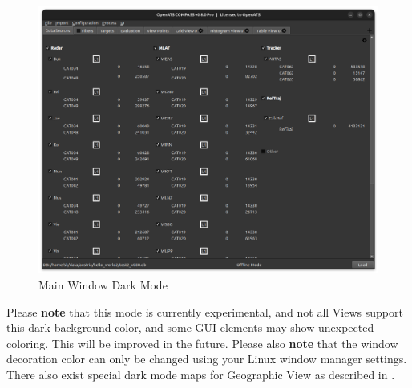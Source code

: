 \begin{figure}[H]
  \hspace*{-2.5cm}
    \includegraphics[width=19cm]{figures/dark_mode.png}
  \caption{Main Window Dark Mode}
\end{figure}

Please \textbf{note} that this mode is currently experimental, and not all Views support this dark background color, and some GUI elements may show unexpected coloring. This will be improved in the future. Please also \textbf{note} that the window decoration color can only be changed using your Linux window manager settings. \\

There also exist special dark mode maps for Geographic View as described in .

